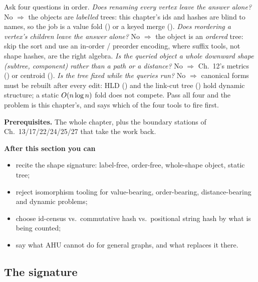\begin{topicintro}
Ask four questions in order.  \emph{Does renaming every vertex leave the answer
alone?}  No \(\Rightarrow\) the objects are \emph{labelled} trees: this chapter's
ids and hashes are blind to names, so the job is a value fold
() or a keyed merge ().  \emph{Does reordering a vertex's
children leave the answer alone?}  No \(\Rightarrow\) the object is an
\emph{ordered} tree: skip the sort and use an in-order / preorder encoding, where
suffix tools, not shape hashes, are the right algebra.  \emph{Is the queried object
a whole downward shape (subtree, component) rather than a path or a distance?}  No
\(\Rightarrow\) Ch.~12's metrics () or centroid
().  \emph{Is the tree fixed while the queries run?}  No \(\Rightarrow\)
canonical forms must be rebuilt after every edit: HLD () and the
link-cut tree () hold dynamic structure; a static
\(O(n\log n)\) fold does not compete.  Pass all four and the problem is
this chapter's, and  says which of the four tools to fire first.

\textbf{Prerequisites.} The whole chapter, plus the boundary stations of
Ch.~13/17/22/24/25/27 that take the work back.

\textbf{After this section you can}
\begin{itemize}[nosep]
  \item recite the shape signature: label-free, order-free, whole-shape object, static tree; \hfill{}
  \item reject isomorphism tooling for value-bearing, order-bearing, distance-bearing and dynamic problems; \hfill{}
  \item choose id-census vs.\ commutative hash vs.\ positional string hash by what is being counted; \hfill{}
  \item say what AHU cannot do for general graphs, and what replaces it there. \hfill{}
\end{itemize}
\end{topicintro}

\subsection{The signature}

